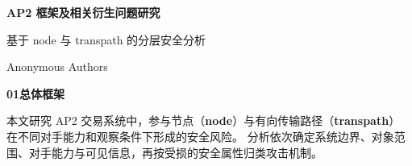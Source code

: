 \documentclass[UTF8,fontset=fandol,a4paper,zihao=-4]{ctexart}
\begin{document}
\thispagestyle{plain}
\begin{center}
  {\fontsize{23}{30}\selectfont\bfseries AP2 框架及相关衍生问题研究\par}
  \vspace{5pt}
  {\fontsize{12}{16}\selectfont\color{teal}基于 node 与 transpath 的分层安全分析\par}
  \vspace{8pt}
  {\fontsize{9.4}{12}\selectfont Anonymous Authors\par}
\end{center}
\vspace{4pt}
{\color{teal}\bfseries 01\quad 总体框架\par}
本文研究 AP2 交易系统中，参与节点（\textbf{node}）与有向传输路径（\textbf{transpath}）
在不同对手能力和观察条件下形成的安全风险。
分析依次确定系统边界、对象范围、对手能力与可见信息，再按受损的安全属性归类攻击机制。
\end{document}
